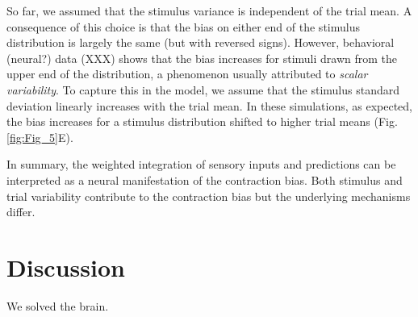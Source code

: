 \documentclass[10pt,a4paper,draft]{article}
\begin{document}
So far, we assumed that the stimulus variance is independent of the trial mean. A consequence of this choice is that the bias on either end of the stimulus distribution is largely the same (but with reversed signs). However, behavioral (neural?) data (XXX) shows that the bias increases for stimuli drawn from the upper end of the distribution, a phenomenon usually attributed to \textit{scalar variability}. To capture this in the model, we assume that the stimulus standard deviation linearly increases with the trial mean. In these simulations, as expected, the bias increases for a stimulus distribution shifted to higher trial means (Fig. \ref{fig:Fig_5}E).

In summary, the weighted integration of sensory inputs and predictions can be interpreted as a neural manifestation of the contraction bias. Both stimulus and trial variability contribute to the contraction bias but the underlying mechanisms differ. 



\section*{Discussion}

We solved the brain.


\end{document}
